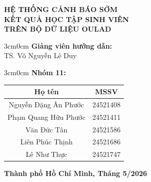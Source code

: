 \documentclass[a4paper]{article}
\begin{document}
\begin{titlepage}
\vspace{5pt}
\begin{center}
    \vspace{10pt}
    \fontsize{17pt}{20pt}\selectfont
    \textbf{HỆ THỐNG CẢNH BÁO SỚM\\KẾT QUẢ HỌC TẬP SINH VIÊN\\TRÊN BỘ DỮ LIỆU OULAD}
\end{center}

\vspace{20pt}
\begin{adjustwidth}{3cm}{0cm}
    \fontsize{13pt}{17pt}\selectfont
    \textbf{Giảng viên hướng dẫn:} \\[5pt]
    \hspace*{1cm}TS. Võ Nguyễn Lê Duy
\end{adjustwidth}

\vspace{10pt}
\begin{adjustwidth}{3cm}{0cm}
    \fontsize{13pt}{17pt}\selectfont
    \textbf{Nhóm 11:}
\end{adjustwidth}

\begin{center}
\fontsize{13pt}{17pt}\selectfont
\renewcommand{\arraystretch}{1.5}
\begin{tabular}{|c|c|}
\hline
\textbf{Họ tên} & \textbf{MSSV}\\
\hline
Nguyễn Đặng Ân Phước & 24521408\\
\hline
Phạm Quang Hữu Phước & 24521411\\
\hline
Văn Đức Tân & 24521586\\
\hline
Liên Phúc Thịnh & 24521686\\
\hline
Lê Như Thực & 24521747\\
\hline
\end{tabular}
\end{center}

\vspace{5pt}
\begin{center}
    \fontsize{14pt}{17pt}\selectfont
    \textbf{Thành phố Hồ Chí Minh, Tháng 5/2026}
\end{center}
\end{titlepage}

\tableofcontents
\newpage


\newpage

\newpage

\end{document}
